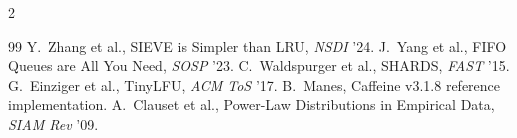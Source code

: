 \begingroup
\footnotesize
\setlength{\parskip}{0pt}
\begin{multicols}{2}
\begin{thebibliography}{99}
\setlength{\itemsep}{0pt}\setlength{\parsep}{0pt}
 Y.~Zhang et al., SIEVE is Simpler than LRU, \emph{NSDI} '24.
   J.~Yang et al., FIFO Queues are All You Need, \emph{SOSP} '23.
 C.~Waldspurger et al., SHARDS, \emph{FAST} '15.
  G.~Einziger et al., TinyLFU, \emph{ACM ToS} '17.
   B.~Manes, Caffeine v3.1.8 reference implementation.
 A.~Clauset et al., Power-Law Distributions in Empirical Data, \emph{SIAM Rev} '09.
\end{thebibliography}
\end{multicols}
\endgroup
